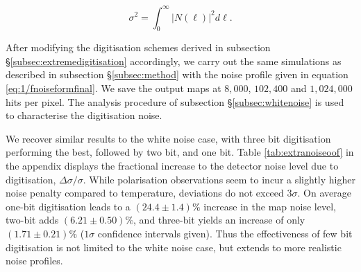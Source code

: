 \documentclass[a4paper,fleqn,usenatbib]{mnras}
\newcommand{\changed}[1]{\textcolor{Red}{#1}}
\begin{document}
\begin{equation} \label{eq:psvl1/f}
\sigma^2 = \int_0^\infty \left| N(\ell) \right|^2 d\ell.
\end{equation}

After modifying the digitisation schemes derived in subsection \S\ref{subsec:extremedigitisation} accordingly, we carry out the same simulations as described in subsection \S\ref{subsec:method} with the noise profile given in equation \ref{eq:1/fnoiseformfinal}. We save the output maps at $8,000$, $102,400$ and $1,024,000$ hits per pixel. The analysis procedure of subsection \S\ref{subsec:whitenoise} is used to characterise the digitisation noise.


We recover similar results to the white noise case, with three bit digitisation performing the best, followed by two bit, and one bit. Table \ref{tab:extranoiseoof} in the appendix displays the fractional increase to the detector noise level due to digitisation, $\Delta \sigma / \sigma$. While polarisation observations seem to incur a slightly higher noise penalty compared to temperature, deviations do not exceed $3\sigma$. On average one-bit digitisation leads to a $(24.4\pm 1.4)\%$ increase in the map noise level, two-bit adds $(6.21\pm0.50)\%$, and three-bit yields an increase of only $(1.71\pm0.21)\%$ ($1\sigma$ confidence intervals given). Thus the effectiveness of few bit digitisation is not limited to the white noise case, but extends to more realistic noise profiles.

\end{document}
